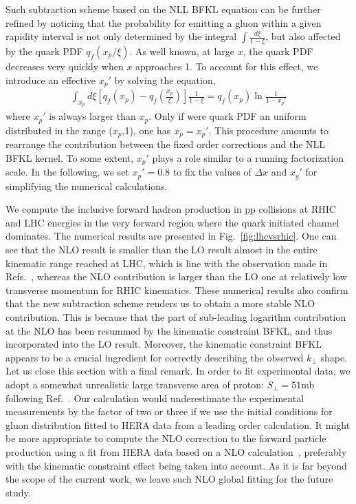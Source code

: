 \documentclass[prd,aps,preprint,tightenlines,nofootinbib,superscriptaddress]{revtex4}
\begin{document}
Such subtraction scheme based on the NLL BFKL equation can be further refined by noticing that the probability for emitting a gluon within a given rapidity interval is not only determined by the integral $\int \frac{d\xi }{1-\xi}$, but also affected by the quark PDF $q_f(x_p/\xi)$. As well known, at large $x$, the quark PDF decreases  very quickly when $x$ approaches 1. To account for this effect, we introduce an effective $x_p'$ by solving the equation,
\begin{eqnarray}
\int_{x_p} d\xi \left [     q_f(x_p) -      q_f(\frac{x_p}{\xi}) \right] \frac{1}{1-\xi} =   q_f(x_p)  \ln \frac{1}{1-x_p'}
   \end{eqnarray}
where  $x_p'$ is always larger than $x_p$. Only if were quark PDF  an uniform distributed  in the range ($x_p$,1),  one has $x_p=x_p'$.  This procedure amounts to rearrange the contribution between the fixed order corrections and the NLL BFKL kernel.   To some extent, $x_p'$ plays a role similar to a running  factorization scale. In the following, we set $x_p'=0.8$ to fix the values of $\Delta x$ and $x_g'$  for simplifying the numerical calculations.

 We compute the inclusive forward hadron production in pp collisions at RHIC and LHC energies in the very forward region where the quark initiated channel  dominates. The  numerical results are presented in Fig.~\ref{fig:lhcvsrhic}.   One can see that the NLO result is smaller than the LO result almost in the entire kinematic range reached at LHC, which is line with the observation made in Refs.~\cite{Iancu:2016vyg,Ducloue:2017mpb,Ducloue:2018lil}, whereas the NLO contribution is larger than the LO one at relatively low transverse momentum for RHIC kinematics. These numerical results also confirm that the new subtraction scheme renders us to obtain a more stable NLO  contribution. This is because that  the part of sub-leading logarithm contribution at the NLO has been resummed by the kinematic constraint BFKL, and thus incorporated into the LO result. Moreover, the kinematic constraint BFKL appears to be a crucial ingredient for correctly describing the observed $k_\perp$ shape. Let us close this section with a final remark.  In order to fit experimental data,  we adopt a somewhat unrealistic large transverse area of proton:  $S_\perp= 51$mb following  Ref.~\cite{Shi:2021hwx}.  Our calculation would  underestimate the experimental measurements by the factor of two or three if we use the initial conditions for gluon distribution fitted to HERA data from a leading order calculation. It might be more appropriate to compute the NLO correction to the forward particle production using a fit from HERA data based on a NLO calculation~\cite{Beuf:2020dxl}, preferably with the kinematic constraint effect being taken into account.  As it is far beyond the scope of the current work, we  leave such NLO global fitting for the future study. 
 
\end{document}
